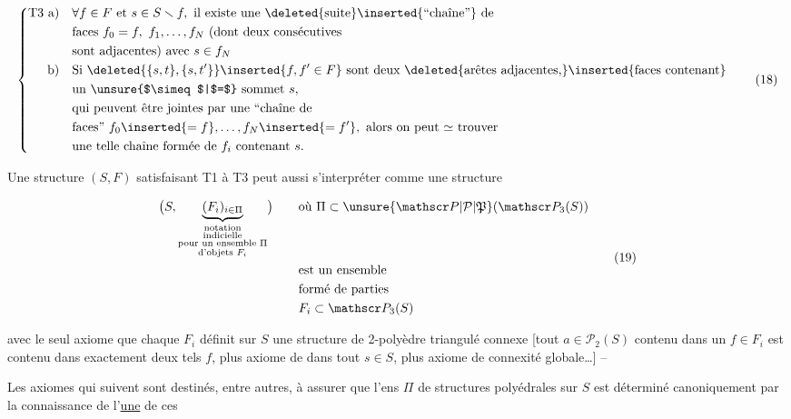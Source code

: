 
\[
\left\{\begin{aligned}
 \mathrm{T3}\ \text{a)}\quad &\forall f\in F\text{ et }s\in S\smallsetminus f,\ \text{il existe une \deleted{suite}\inserted{``chaîne''} de}\\
 &\text{faces }f_0=f,\ f_1,\ldots,f_N\ \text{(dont deux consécutives}\\
 &\text{sont adjacentes) avec }s\in f_N\\
 \text{b)}\quad &\text{Si }\deleted{\{s,t\},\{s,t'\}}\inserted{f,f'\in F}\text{ sont deux \deleted{arêtes adjacentes,}\inserted{faces contenant}}\\
 &\text{un \unsure{$\simeq$|$=$} sommet }s,\\
 &\text{qui peuvent être jointes par une ``chaîne de}\\
 &\text{faces''\ }f_0\inserted{=f},\ldots,f_N\inserted{=f'},\ \text{alors on peut $\simeq$ trouver}\\
 &\text{une telle chaîne formée de }f_i\text{ contenant }s.
\end{aligned}\right.\tag*{(18)}
\]

Une structure $(S,F)$ satisfaisant T1 à T3 peut aussi s'interpréter comme une structure

\[
\begin{aligned}
 \bigl(S,\underbrace{(F_i)_{i\in\Pi}}_{\substack{\text{notation}\\\text{indicielle}\\\text{pour un ensemble }\Pi\\\text{d'objets }F_i}}\bigr)\qquad
 &\text{où }\Pi\subset\unsure{\mathscr P|\mathcal P|\mathfrak P}(\mathscr P_3(S))\\
 &\text{est un ensemble}\\
 &\text{formé de parties}\\
 &F_i\subset\mathscr P_3(S)
\end{aligned}\tag*{(19)}
\]

avec le seul axiome que chaque $F_i$ définit sur $S$ une structure de 2-polyèdre triangulé connexe [tout $a\in\mathscr P_2(S)$ contenu dans un $f\in F_i$ est contenu dans exactement deux tels $f$, plus axiome de  dans tout  $s\in S$, plus axiome de connexité globale\ldots] --


Les axiomes qui suivent sont destinés, entre autres, à assurer que  l'ens $\Pi$ de structures polyédrales sur $S$ est déterminé canoniquement par la connaissance de l'\uline{une} de ces
